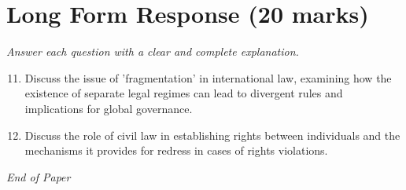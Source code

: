 \documentclass[12pt]{article}
\begin{document}
\section*{Long Form Response (20 marks)}
\textit{Answer each question with a clear and complete explanation.}
\begin{enumerate}[label=\arabic*.]
\setcounter{enumi}{10}
\item Discuss the issue of 'fragmentation' in international law, examining how the existence of separate legal regimes can lead to divergent rules and implications for global governance.
\item Discuss the role of civil law in establishing rights between individuals and the mechanisms it provides for redress in cases of rights violations.
\end{enumerate}

\vfill
\noindent\textit{End of Paper}
\end{document}
